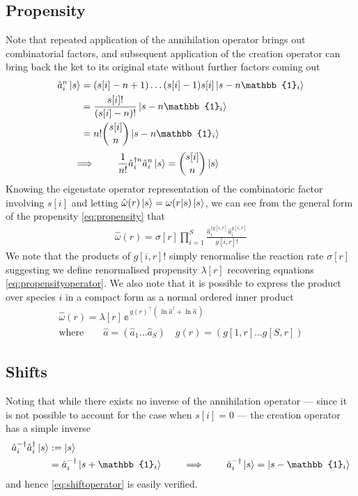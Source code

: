 \documentclass{article}[12pt]
\numberwithin{equation}{section}
\begin{document}
\subsection{Propensity}
Note that repeated application of the annihilation operator brings
out combinatorial factors, and subsequent application of the
creation operator can bring back the ket to its original state without
further factors coming out
\begin{align*}
		\hat{a}_i^n\ket{s}
		&=(s[i]-n+1)\dots(s[i]-1)s[i]\ket{s-n\mathbb{1}_i}\\
		&=\frac{s[i]!}{(s[i]-n)!}\ket{s-n\mathbb{1}_i}\\
		&=n!{s[i] \choose n}\ket{s-n\mathbb{1}_i}
\end{align*}
\vspace{-30pt}
\begin{align}
		\implies\qquad\frac{1}{n!}\hat{a}_i^{\dagger n}\hat{a}_i^n\ket{s}
		&={s[i] \choose n}\ket{s}\qquad\qquad\qquad
\end{align}
Knowing the eigenstate operator representation of the combinatoric
factor involving $s[i]$ and letting $\hat{\omega}(r)\ket{s}=\omega(r|s)\ket{s}$,
we can see from the general form of the propensity
\eqref{eq:propensity} that
\begin{align*}
	\hat\omega(r)=
	\sigma[r]
		\prod_{i=1}^S
		\frac{\hat{a}_i^{\dagger g[i,r]}\hat{a}_i^{g[i,r]}}{g[i,r]!}
\end{align*}
We note that the products of $g[i,r]!$ simply renormalise the reaction rate
$\sigma[r]$ suggesting we define renormalised propensity $\lambda[r]$ recovering
equations \eqref{eq:propensityoperator}. We also note that it is possible to
express the product over species $i$ in a compact form as a normal ordered inner
product
\begin{align}
	\hat\omega(r)=
	\lambda[r]\,
		\mathbb{e}^{\,g(r)^{\top}\left(\,\ln\hat{a}^{\dagger}+\ln\hat{a} \,\right)}
		\qquad\qquad\quad\\
		\text{where}\qquad
		\hat{a}=(\hat{a}_1\dots \hat{a}_S)\quad
		g(r)=(g[1,r]\dots g[S,r])
\end{align}
\subsection{Shifts}
\vspace{-10pt}
Noting that while there exists no inverse of the annihilation operator --- since
it is not possible to account for the case when $s[i]=0$ --- the creation
operator has a simple inverse
\begin{align*}
	\hat{a}_i^{-\dagger}\hat{a}_i^{\dagger}\ket{s}
	& :=\ket{s}\\
	&=\hat{a}_i^{-\dagger}\ket{s+\mathbb{1}_i}
	\qquad\implies\qquad
	\hat{a}_i^{-\dagger}\ket{s}
	=\ket{s-\mathbb{1}_i}
\end{align*}
and hence \eqref{eq:shiftoperator} is easily verified.
\end{document}
